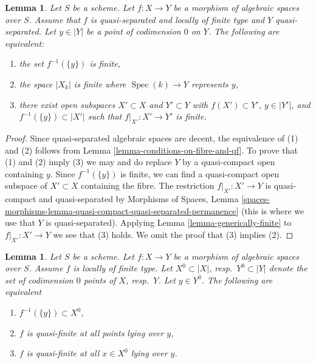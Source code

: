 \documentclass{stacks-project}
\theoremstyle{plain}
\newtheorem{lemma}[subsection]{Lemma}
\theoremstyle{definition}
\theoremstyle{remark}
\numberwithin{equation}{subsection}
\def\Spec{\mathop{\mathrm{Spec}}}
\begin{document}
\begin{lemma}
\label{lemma-generically-finite-reprise}
Let $S$ be a scheme. Let $f : X \to Y$ be a morphism of algebraic spaces
over $S$. Assume that $f$ is quasi-separated and locally of finite type
and $Y$ quasi-separated. Let $y \in |Y|$ be a point of codimension $0$ on $Y$.
The following are equivalent:
\begin{enumerate}
\item the set $f^{-1}(\{y\})$ is finite,
\item the space $|X_k|$ is finite where $\Spec(k) \to Y$ represents $y$,
\item there exist open subspaces $X' \subset X$ and $Y' \subset Y$
with $f(X') \subset Y'$, $y \in |Y'|$, and $f^{-1}(\{y\}) \subset |X'|$
such that $f|_{X'} : X' \to Y'$ is finite.
\end{enumerate}
\end{lemma}

\begin{proof}
Since quasi-separated algebraic spaces are decent, the equivalence
of (1) and (2) follows from
Lemma \ref{lemma-conditions-on-fibre-and-qf}.
To prove that (1) and (2) imply (3)
we may and do replace $Y$ by a quasi-compact open containing $y$.
Since $f^{-1}(\{y\})$ is finite, we can find a quasi-compact
open subspace of $X' \subset X$ containing the fibre.
The restriction $f|_{X'} : X' \to Y$ is quasi-compact and quasi-separated
by Morphisms of Spaces, Lemma
\ref{spaces-morphisms-lemma-quasi-compact-quasi-separated-permanence}
(this is where we use that $Y$ is quasi-separated).
Applying Lemma \ref{lemma-generically-finite}
to $f|_{X'} : X' \to Y$ we see that (3) holds.
We omit the proof that (3) implies (2).
\end{proof}

\begin{lemma}
\label{lemma-quasi-finiteness-over-generic-point}
Let $S$ be a scheme. Let $f : X \to Y$ be a morphism of algebraic spaces
over $S$. Assume $f$ is locally of finite type.
Let $X^0 \subset |X|$, resp.\ $Y^0 \subset |Y|$ denote the set of
codimension $0$ points of $X$, resp.\ $Y$. Let $y \in Y^0$. The following are
equivalent
\begin{enumerate}
\item $f^{-1}(\{y\}) \subset X^0$,
\item $f$ is quasi-finite at all points lying over $y$,
\item $f$ is quasi-finite at all $x \in X^0$ lying over $y$.
\end{enumerate}
\end{lemma}
\end{document}
